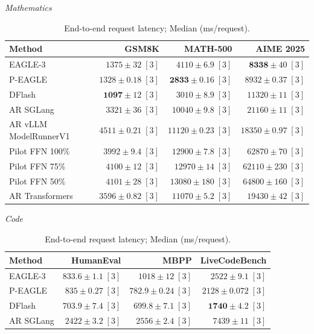 \begin{table}[!htp]
\centering\small
\setlength{\tabcolsep}{3pt}
\caption{End-to-end request latency; Median (ms/request).}
\label{tab:appendix-metric-completion-median-none}
\textit{Mathematics}\par\smallskip
\begin{tabular}{@{}>{\raggedright\arraybackslash}p{3.7cm}rrr@{}}
\toprule
Method & GSM8K & MATH-500 & AIME 2025 \\
\midrule
EAGLE-3 & \(1375 \pm 32\;[3]\) & \(4110 \pm 6.9\;[3]\) & \(\mathbf{8338} \pm 40\;[3]\) \\
P-EAGLE & \(1328 \pm 0.18\;[3]\) & \(\mathbf{2833} \pm 0.16\;[3]\) & \(8932 \pm 0.37\;[3]\) \\
DFlash & \(\mathbf{1097} \pm 12\;[3]\) & \(3010 \pm 8.9\;[3]\) & \(11320 \pm 11\;[3]\) \\
AR \textperiodcentered{} SGLang & \(3321 \pm 36\;[3]\) & \(10040 \pm 9.8\;[3]\) & \(21160 \pm 11\;[3]\) \\
AR \textperiodcentered{} vLLM ModelRunnerV1 & \(4511 \pm 0.21\;[3]\) & \(11120 \pm 0.23\;[3]\) & \(18350 \pm 0.97\;[3]\) \\
Pilot FFN 100\% & \(3992 \pm 9.4\;[3]\) & \(12900 \pm 7.8\;[3]\) & \(62870 \pm 70\;[3]\) \\
Pilot FFN 75\% & \(4100 \pm 12\;[3]\) & \(12970 \pm 14\;[3]\) & \(62110 \pm 230\;[3]\) \\
Pilot FFN 50\% & \(4101 \pm 28\;[3]\) & \(13080 \pm 180\;[3]\) & \(64800 \pm 160\;[3]\) \\
AR \textperiodcentered{} Transformers & \(3596 \pm 0.82\;[3]\) & \(11070 \pm 5.2\;[3]\) & \(19430 \pm 42\;[3]\) \\
\bottomrule
\end{tabular}\par\medskip
\textit{Code}\par\smallskip
\begin{tabular}{@{}>{\raggedright\arraybackslash}p{3.7cm}rrr@{}}
\toprule
Method & HumanEval & MBPP & LiveCodeBench \\
\midrule
EAGLE-3 & \(833.6 \pm 1.1\;[3]\) & \(1018 \pm 12\;[3]\) & \(2522 \pm 9.1\;[3]\) \\
P-EAGLE & \(835 \pm 0.27\;[3]\) & \(782.9 \pm 0.24\;[3]\) & \(2128 \pm 0.072\;[3]\) \\
DFlash & \(\mathbf{703.9} \pm 7.4\;[3]\) & \(\mathbf{699.8} \pm 7.1\;[3]\) & \(\mathbf{1740} \pm 4.2\;[3]\) \\
AR \textperiodcentered{} SGLang & \(2422 \pm 3.2\;[3]\) & \(2556 \pm 2.4\;[3]\) & \(7439 \pm 11\;[3]\) \\

\end{tabular}
\end{table}
